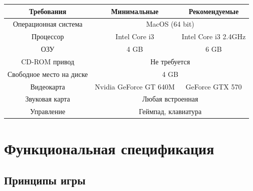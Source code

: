 \documentclass{article}
\begin{document}
\begin{tabular}{|c|cc|}
\hline
Требования               & \multicolumn{1}{c|}{Минимальные}            & Рекомендуемые        \\ \hline
Операционная система     & \multicolumn{2}{c|}{MacOS (64 bit)}                                \\ \hline
Процессор                & \multicolumn{1}{c|}{Intel Core i3}          & Intel Core i3 2.4GHz \\ \hline
ОЗУ                      & \multicolumn{1}{c|}{4 GB}                   & 6 GB                 \\ \hline
CD-ROM привод            & \multicolumn{2}{c|}{Не требуется}                                  \\ \hline
Свободное место на диске & \multicolumn{2}{c|}{4 GB}                                          \\ \hline
Видеокарта               & \multicolumn{1}{c|}{Nvidia GeForce GT 640M} & GeForce GTX 570      \\ \hline
Звуковая карта           & \multicolumn{2}{c|}{Любая встроенная}                              \\ \hline
Управление               & \multicolumn{2}{c|}{Геймпад, клавиатура}                           \\ \hline
\end{tabular}


\section{Функциональная спецификация}

\subsection{Принципы игры}
\end{document}
